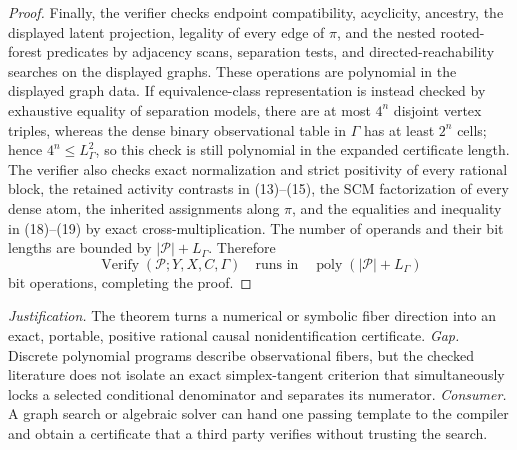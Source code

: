 \documentclass{article}
\begin{document}
\begin{proof}
Finally, the verifier checks endpoint compatibility, acyclicity, ancestry, the displayed latent projection, legality of every edge of \(\pi\), and the nested rooted-forest predicates by adjacency scans, separation tests, and directed-reachability searches on the displayed graphs.  These operations are polynomial in the displayed graph data.  If equivalence-class representation is instead checked by exhaustive equality of separation models, there are at most \(4^n\) disjoint vertex triples, whereas the dense binary observational table in \(\Gamma\) has at least \(2^n\) cells; hence \(4^n\le L_\Gamma^2\), so this check is still polynomial in the expanded certificate length.  The verifier also checks exact normalization and strict positivity of every rational block, the retained activity contrasts in (13)--(15), the SCM factorization of every dense atom, the inherited assignments along \(\pi\), and the equalities and inequality in (18)--(19) by exact cross-multiplication.  The number of operands and their bit lengths are bounded by \(|\mathcal P|+L_\Gamma\).  Therefore
\[
 \operatorname{Verify}(\mathcal P;Y,X,C,\Gamma)
 \quad\text{runs in}\quad
 \operatorname{poly}(|\mathcal P|+L_\Gamma)
\]
bit operations, completing the proof.
\end{proof}
\par\smallskip\noindent \textit{Justification.} The theorem turns a numerical or symbolic fiber direction into an exact, portable, positive rational causal nonidentification certificate. \textit{Gap.} Discrete polynomial programs describe observational fibers, but the checked literature does not isolate an exact simplex-tangent criterion that simultaneously locks a selected conditional denominator and separates its numerator. \textit{Consumer.} A graph search or algebraic solver can hand one passing template to the compiler and obtain a certificate that a third party verifies without trusting the search.
\end{document}
